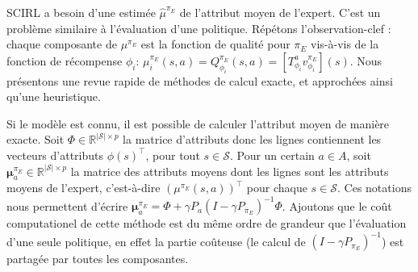 \documentclass[english,utf8]{./hermes-journal}
\newcommand{\s}{\mathcal{S}}
\newcommand{\A}{\mathcal{A}}
\newcommand{\Mu}{\boldsymbol{\mu}}
\begin{document}
SCIRL a besoin d'une estimée $\hat{\mu}^{\pi_E}$ de l'attribut moyen de l'expert. C'est un problème similaire à l'évaluation d'une politique. Répétons l'observation-clef : chaque composante de 
$\mu^{\pi_E}$ est la fonction de qualité pour $\pi_E$ vis-à-vis de la fonction de récompense $\phi_i$: $\mu_i^{\pi_E}(s,a) = Q^{\pi_E}_{\phi_i}(s,a) =
[T^a_{\phi_i} v^{\pi_E}_{\phi_i}](s)$. Nous présentons une revue rapide de méthodes de calcul exacte, et approchées ainsi qu'une heuristique.

Si le modèle est connu, il est possible de calculer l'attribut moyen de manière exacte. Soit $\Phi\in\mathbb{R}^{|\s|\times p}$ la matrice d'attributs donc les lignes contiennent les vecteurs d'attributs $\phi(s)^\top$, pour tout
$s\in\s$.
%
%
Pour un certain $a\in A$, soit $\Mu^{\pi_E}_a \in\mathbb{R}^{|\s|\times
p}$ la matrice des attributs moyens dont les lignes sont les attributs moyens de l'expert, c'est-à-dire  $(\mu^{\pi_E}(s,a))^\top$ pour chaque $s\in\s$.
Ces notations nous permettent d'écrire $\Mu_a^{\pi_E} = \Phi + \gamma
P_a(I-\gamma P_{\pi_E})^{-1} \Phi$.
Ajoutons que le coût computationel de cette méthode est du même ordre de grandeur que l'évaluation d'une seule politique, en effet la partie coûteuse (le calcul de $(I-\gamma P_{\pi_E})^{-1}$) est partagée par toutes les composantes.
\end{document}
